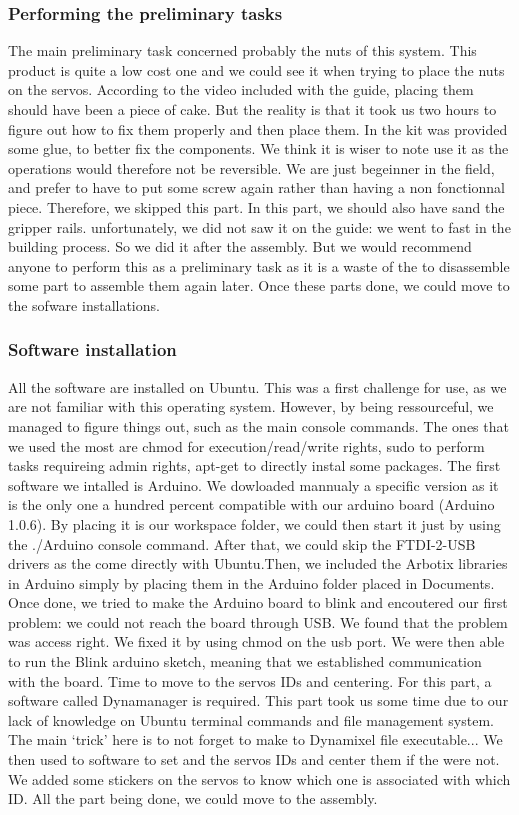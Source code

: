 \documentclass[aps,letterpaper,11pt]{revtex4}
\begin{document}
\subsubsection{Performing the preliminary tasks}

The main preliminary task concerned probably the nuts of this system. This product is quite a low cost one and we could see it when trying to place the nuts on the servos. According to the video included with the guide, placing them should have been a piece of cake. But the reality is that it took us two hours to figure out how to fix them properly and then place them.
In the kit was provided some glue, to better fix the components. We think it is wiser to note use it as the operations would therefore not be reversible. We are just begeinner in the field, and prefer to have to put some screw again rather than having a non fonctionnal piece. Therefore, we skipped this part.
In this part, we should also have sand the gripper rails. unfortunately, we did not saw it on the guide: we went to fast in the building process. So we did it after the assembly. But we would recommend anyone to perform this as a preliminary task as it is a waste of the to disassemble some part to assemble them again later.
Once these parts done, we could move to the sofware installations.

\subsubsection{Software installation}

All the software are installed on Ubuntu. This was a first challenge for use, as we are not familiar with this operating system. However, by being ressourceful, we managed to figure things out, such as the main console commands. The ones that we used the most are {chmod} for execution/read/write rights, {sudo} to perform tasks requireing admin rights, {apt-get} to directly instal some packages.
The first software we intalled is Arduino. We dowloaded mannualy a specific version as it is the only one a hundred percent compatible with our arduino board (Arduino 1.0.6). By placing it is our workspace folder, we could then start it just by using the {./Arduino} console command.
After that, we could skip the FTDI-2-USB drivers as the come directly with Ubuntu.Then, we included the Arbotix libraries in Arduino simply by placing them in the Arduino folder placed in {Documents}. Once done, we tried to make the Arduino board to blink and encoutered our first problem: we could not reach the board through USB. We found that the problem was access right. We fixed it by using {chmod} on the usb port. We were then able to run the Blink arduino sketch, meaning that we established communication with the board. Time to move to the servos IDs and centering.
For this part, a software called Dynamanager is required. This part took us some time due to our lack of knowledge on Ubuntu terminal commands and file management system. The main `trick' here is to not forget to make to Dynamixel file executable... We then used to software to set and the servos IDs and center them if the were not. We added some stickers on the servos to know which one is associated with which ID.
All the part being done, we could move to the assembly.
\end{document}
